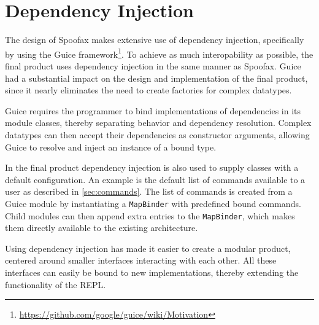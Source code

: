\section{Dependency Injection}
\label{sec:injection}

The design of Spoofax makes extensive use of dependency injection, specifically
by using the Guice framework\footnote{\url{https://github.com/google/guice/wiki/Motivation}}.
To achieve as much interopability as possible, the final product
uses dependency injection in the same manner as Spoofax. Guice had a
substantial impact on the design and implementation of the final product, since
it nearly eliminates the need to create factories for complex datatypes.

Guice requires the programmer to bind implementations of dependencies in its
module classes, thereby separating behavior and dependency resolution.  Complex
datatypes can then accept their dependencies as constructor arguments, allowing
Guice to resolve and inject an instance of a bound type.

In the final product dependency injection is also used to supply classes
with a default configuration.  An example is the default list of commands
available to a user as described in \cref{sec:commands}.  The list of commands
is created from a Guice module by instantiating a \texttt{MapBinder} with
predefined bound commands. Child modules can then append extra entries to the
\texttt{MapBinder}, which makes them directly available to the existing
architecture.

Using dependency injection has made it easier to create a modular product,
centered around smaller interfaces interacting with each other. All these
interfaces can easily be bound to new implementations, thereby extending the
functionality of the REPL.
